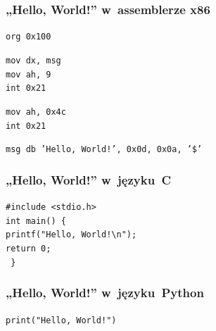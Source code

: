 \documentclass[10pt,t]{beamer}
\begin{document}
\begin{frame}
  \frametitle{„Hello, World!” w~assemblerze x86
    \parencite{Anonymous-Hello-World-in-x86-Assembly-Language}}


  \texttt{org 0x100} \\
  \vspace{0.8em}

  \texttt{mov dx, msg} \\
  \texttt{mov ah, 9} \\
  \texttt{int 0x21} \\
  \vspace{0.8em}

  \texttt{mov ah, 0x4c} \\
  \texttt{int 0x21} \\
  \vspace{0.8em}

  \texttt{msg db 'Hello, World!', 0x0d, 0x0a, '\$'}

\end{frame}





\begin{frame}
  \frametitle{„Hello, World!” w~języku~C}


  \texttt{\#include <stdio.h>} \\
  \vspace{0.8em}
  \texttt{int main() \{ } \\
  \hphantom{aaaa} \texttt{printf("Hello, World!\textbackslash n");} \\
  \vspace{0.8em}
  \vspace{0.8em}
  \vspace{0.8em}
  \vspace{0.8em}
  \hphantom{aaaa} \texttt{return 0;} \\
  \texttt{ \} }

\end{frame}





\begin{frame}
  \frametitle{„Hello, World!” w~języku~Python}


  \texttt{print("Hello, World!")}

\end{frame}
\end{document}
